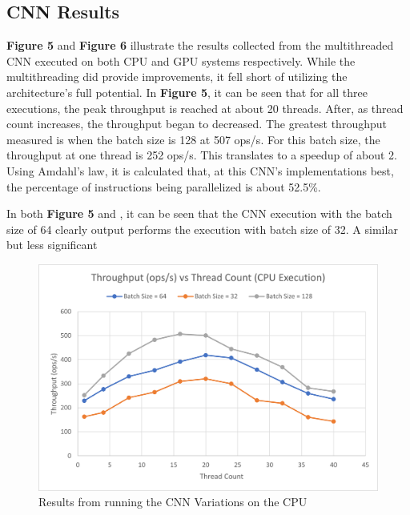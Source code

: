 \documentclass[journal]{IEEEtran}
\begin{document}
\subsection{CNN Results}
\textbf{Figure 5} and \textbf{Figure 6} illustrate the results collected from the multithreaded CNN executed on both CPU and GPU systems respectively. While the multithreading did provide improvements, it fell short of utilizing the architecture's full potential. In \textbf{Figure 5}, it can be seen that for all three executions, the peak throughput is reached at about 20 threads. After, as thread count increases, the throughput began to decreased. The greatest throughput measured is when the batch size is 128 at 507 ops/s. For this batch size, the throughput at one thread is 252 ops/s. This translates to a speedup of about 2. Using Amdahl's law, it is calculated that, at this CNN's implementations best, the percentage of instructions being parallelized is about 52.5\%. 
\par
In both \textbf{Figure 5} and , it can be seen that the CNN execution with the batch size of 64 clearly output performs the execution with batch size of 32. A similar but less significant 

\begin{figure}[!t]
\centering
\includegraphics[width=\linewidth]{CNN_CPU_Throughput.png}
\caption{Results from running the CNN Variations on the CPU}
\label{fig_sim}
\end{figure}
\end{document}
